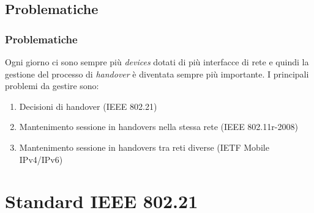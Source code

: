 \documentclass[10pt]{beamer}
\begin{document}
\subsection{Problematiche}
\begin{frame}
\frametitle{Problematiche}
Ogni giorno ci sono sempre più {\em devices} dotati di più interfacce di rete e quindi la gestione del processo di {\em handover} è diventata sempre più importante. I principali problemi da gestire sono:
\begin{enumerate}
\item Decisioni di handover (IEEE 802.21)
\item Mantenimento sessione in handovers nella stessa rete (IEEE 802.11r-2008)
\item Mantenimento sessione in handovers tra reti diverse (IETF Mobile IPv4/IPv6)
\end{enumerate}
\end{frame}


\section{Standard IEEE 802.21}
\end{document}
